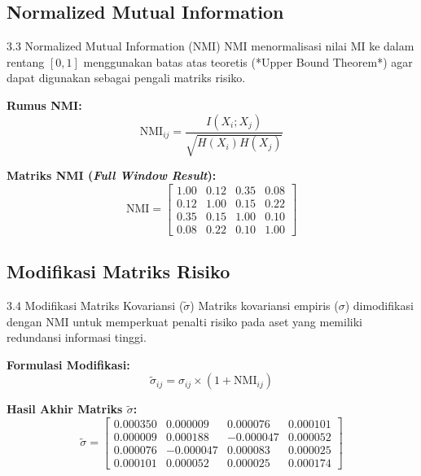 \subsection{Normalized Mutual Information}
\begin{frame}{3.3 Normalized Mutual Information (NMI)}
NMI menormalisasi nilai MI ke dalam rentang $[0, 1]$ menggunakan batas atas teoretis (*Upper Bound Theorem*) agar dapat digunakan sebagai pengali matriks risiko.

\textbf{Rumus NMI:}
\begin{equation}
\text{NMI}_{ij} = \frac{I(X_i; X_j)}{\sqrt{H(X_i)H(X_j)}}
\end{equation}

\textbf{Matriks NMI (\textit{Full Window Result}):}
\begin{equation}
\text{NMI} = 
\begin{bmatrix} 
1.00 & 0.12 & 0.35 & 0.08 \\
0.12 & 1.00 & 0.15 & 0.22 \\
0.35 & 0.15 & 1.00 & 0.10 \\
0.08 & 0.22 & 0.10 & 1.00
\end{bmatrix}
\end{equation}
\end{frame}

\subsection{Modifikasi Matriks Risiko}
\begin{frame}{3.4 Modifikasi Matriks Kovariansi ($\tilde{\sigma}$)}
Matriks kovariansi empiris ($\sigma$) dimodifikasi dengan NMI untuk memperkuat penalti risiko pada aset yang memiliki redundansi informasi tinggi.

\textbf{Formulasi Modifikasi:}
\begin{equation}
\tilde{\sigma}_{ij} = \sigma_{ij} \times (1 + \text{NMI}_{ij})
\end{equation}

\textbf{Hasil Akhir Matriks $\tilde{\sigma}$:}
\begin{equation}
\tilde{\sigma} = 
\begin{bmatrix} 
0.000350 & 0.000009 & 0.000076 & 0.000101 \\
0.000009 & 0.000188 & -0.000047 & 0.000052 \\
0.000076 & -0.000047 & 0.000083 & 0.000025 \\
0.000101 & 0.000052 & 0.000025 & 0.000174
\end{bmatrix}
\end{equation}
\end{frame}
